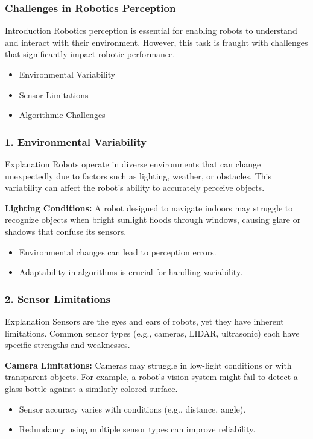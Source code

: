 \documentclass{beamer}
\begin{document}
\begin{frame}[fragile]
    \frametitle{Challenges in Robotics Perception}
    \begin{block}{Introduction}
        Robotics perception is essential for enabling robots to understand and interact with their environment. However, this task is fraught with challenges that significantly impact robotic performance.
    \end{block}
    \begin{itemize}
        \item Environmental Variability
        \item Sensor Limitations
        \item Algorithmic Challenges
    \end{itemize}
\end{frame}

\begin{frame}[fragile]
    \frametitle{1. Environmental Variability}
    \begin{block}{Explanation}
        Robots operate in diverse environments that can change unexpectedly due to factors such as lighting, weather, or obstacles. This variability can affect the robot's ability to accurately perceive objects.
    \end{block}
    \begin{example}
        \textbf{Lighting Conditions:} A robot designed to navigate indoors may struggle to recognize objects when bright sunlight floods through windows, causing glare or shadows that confuse its sensors.
    \end{example}
    \begin{itemize}
        \item Environmental changes can lead to perception errors.
        \item Adaptability in algorithms is crucial for handling variability.
    \end{itemize}
\end{frame}

\begin{frame}[fragile]
    \frametitle{2. Sensor Limitations}
    \begin{block}{Explanation}
        Sensors are the eyes and ears of robots, yet they have inherent limitations. Common sensor types (e.g., cameras, LIDAR, ultrasonic) each have specific strengths and weaknesses.
    \end{block}
    \begin{example}
        \textbf{Camera Limitations:} Cameras may struggle in low-light conditions or with transparent objects. For example, a robot's vision system might fail to detect a glass bottle against a similarly colored surface.
    \end{example}
    \begin{itemize}
        \item Sensor accuracy varies with conditions (e.g., distance, angle).
        \item Redundancy using multiple sensor types can improve reliability.
    \end{itemize}
\end{frame}
\end{document}
